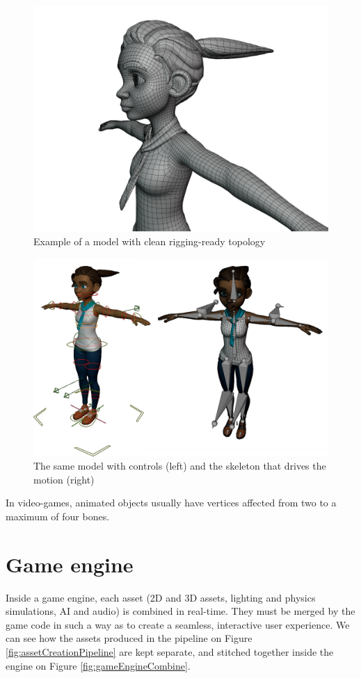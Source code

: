 \documentclass[12pt,twoside]{report}
\begin{document}
\begin{figure}[hp]
\centering
\includegraphics[width=45ex]{graphics/cleanTopology.png}
\caption[Example of a model with clean rigging-ready topology]{Example of a model with clean rigging-ready topology \\  }
\label{fig:cleanTopology}
\end{figure}

\begin{figure}[hp]
\centering
\includegraphics[width=65ex]{graphics/rain_rig.png}
\caption[The same model with controls and the skeleton that drives the motion]{The same model with controls (left) and the skeleton that drives the motion (right) \\  }
\label{fig:rain_rig}
\end{figure}

In video-games, animated objects usually have vertices affected from two to a maximum of four bones.

\section{Game engine}
\label{sec:gameEngine}
Inside a game engine, each asset (2D and 3D assets, lighting and physics simulations, AI and audio) is combined in real-time. They must be merged by the game code in such a way as to create a seamless, interactive user experience. We can see how the assets produced in the pipeline on Figure \ref{fig:assetCreationPipeline} are kept separate, and stitched together inside the engine on Figure \ref{fig:gameEngineCombine}.
\end{document}
